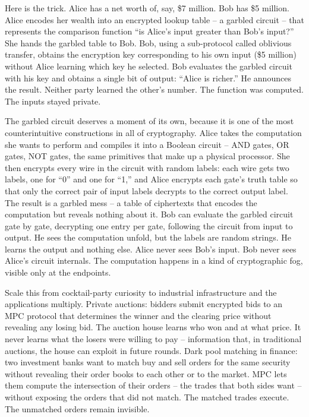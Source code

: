 \documentclass[
  11pt,
  openany]{report}
\begin{document}
Here is the trick. Alice has a net worth of, say, \$7 million. Bob has \$5
million. Alice encodes her wealth into an encrypted lookup table -- a garbled
circuit -- that represents the comparison function ``is Alice's input greater
than Bob's input?'' She hands the garbled table to Bob. Bob, using a
sub-protocol called oblivious transfer, obtains the encryption key corresponding
to his own input (\$5 million) without Alice learning which key he selected. Bob
evaluates the garbled circuit with his key and obtains a single bit of output:
``Alice is richer.'' He announces the result. Neither party learned the other's
number. The function was computed. The inputs stayed private.

The garbled circuit deserves a moment of its own, because it is one of the most
counterintuitive constructions in all of cryptography. Alice takes the
computation she wants to perform and compiles it into a Boolean circuit -- AND
gates, OR gates, NOT gates, the same primitives that make up a physical
processor. She then encrypts every wire in the circuit with random labels: each
wire gets two labels, one for ``0'' and one for ``1,'' and Alice encrypts each
gate's truth table so that only the correct pair of input labels decrypts to the
correct output label. The result is a garbled mess -- a table of ciphertexts
that encodes the computation but reveals nothing about it. Bob can evaluate the
garbled circuit gate by gate, decrypting one entry per gate, following the
circuit from input to output. He sees the computation unfold, but the labels are
random strings. He learns the output and nothing else. Alice never sees Bob's
input. Bob never sees Alice's circuit internals. The computation happens in a
kind of cryptographic fog, visible only at the endpoints.

Scale this from cocktail-party curiosity to industrial infrastructure and the
applications multiply. Private auctions: bidders submit encrypted bids to an MPC
protocol that determines the winner and the clearing price without revealing any
losing bid. The auction house learns who won and at what price. It never learns
what the losers were willing to pay -- information that, in traditional
auctions, the house can exploit in future rounds. Dark pool matching in finance:
two investment banks want to match buy and sell orders for the same security
without revealing their order books to each other or to the market. MPC lets
them compute the intersection of their orders -- the trades that both sides want
-- without exposing the orders that did not match. The matched trades execute.
The unmatched orders remain invisible.
\end{document}
